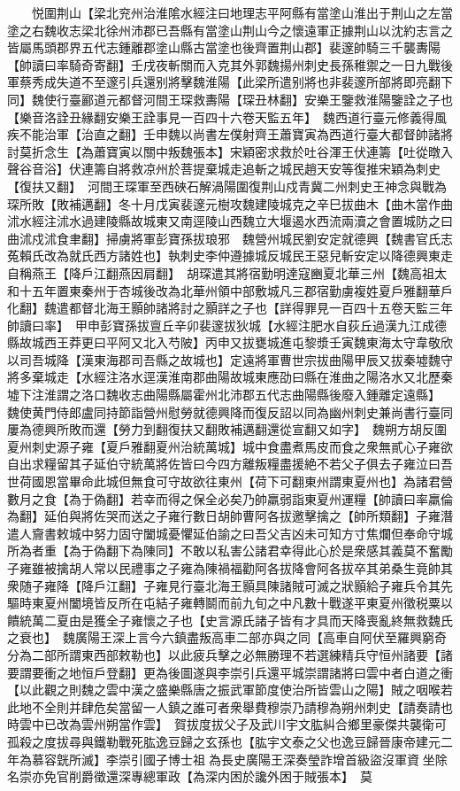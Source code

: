 　　悦圍荆山【梁北兖州治淮隂水經注曰地理志平阿縣有當塗山淮出于荆山之左當塗之右魏收志梁北徐州沛郡已吾縣有當塗山荆山今之懷遠軍正據荆山以沈約志言之皆屬馬頭郡界五代志鍾離郡塗山縣古當塗也後齊置荆山郡】裴邃帥騎三千襲夀陽【帥讀曰率騎奇寄翻】壬戌夜斬關而入克其外郭魏揚州刺史長孫稚禦之一日九戰後軍蔡秀成失道不至邃引兵還别將擊魏淮陽【此梁所遣别將也非裴邃所部將即亮翻下同】魏使行臺酈道元都督河間王琛救夀陽【琛丑林翻】安樂王鑒救淮陽鑒詮之子也【樂音洛詮丑緣翻安樂王詮事見一百四十六卷天監五年】　魏西道行臺元修義得風疾不能治軍【治直之翻】壬申魏以尚書左僕射齊王蕭寶寅為西道行臺大都督帥諸將討莫折念生【為蕭寶寅以關中叛魏張本】宋穎密求救於吐谷渾王伏連籌【吐從暾入聲谷音浴】伏連籌自將救凉州於菩提棄城走追斬之城民趙天安等復推宋穎為刺史【復扶又翻】　河間王琛軍至西硤石解渦陽圍復荆山戍青冀二州刺史王神念與戰為琛所敗【敗補邁翻】冬十月戊寅裴邃元樹攻魏建陵城克之辛巳拔曲木【曲木當作曲沭水經注沭水過建陵縣故城東又南逕陵山西魏立大堰遏水西流兩瀆之會置城防之曰曲沭戍沭食聿翻】掃虜將軍彭寶孫拔琅邪　魏營州城民劉安定就德興【魏書官氏志菟賴氏改為就氏西方諸姓也】執刺史李仲遵據城反城民王惡兒斬安定以降德興東走自稱燕王【降戶江翻燕因肩翻】　胡琛遣其將宿勤明達寇豳夏北華三州【魏高祖太和十五年置東秦州于杏城後改為北華州領中部敷城凡三郡宿勤虜複姓夏戶雅翻華戶化翻】魏遣都督北海王顥帥諸將討之顥詳之子也【詳得罪見一百四十五卷天監三年帥讀曰率】　甲申彭寶孫拔亶丘辛卯裴邃拔狄城【水經注肥水自荻丘過漢九江成德縣故城西王莽更曰平阿又北入芍陂】丙申又拔甕城進屯黎漿壬寅魏東海太守韋敬欣以司吾城降【漢東海郡司吾縣之故城也】定遠將軍曹世宗拔曲陽甲辰又拔秦墟魏守將多棄城走【水經注洛水逕漢淮南郡曲陽故城東應劭曰縣在淮曲之陽洛水又北歷秦墟下注淮謂之洛口魏收志曲陽縣屬霍州北沛郡五代志曲陽縣後廢入鍾離定遠縣】　魏使黄門侍郎盧同持節詣營州慰勞就德興降而復反詔以同為幽州刺史兼尚書行臺同屢為德興所敗而還【勞力到翻復扶又翻敗補邁翻還從宣翻又如字】　魏朔方胡反圍夏州刺史源子雍【夏戶雅翻夏州治統萬城】城中食盡煮馬皮而食之衆無貳心子雍欲自出求糧留其子延伯守統萬將佐皆曰今四方離叛糧盡援絶不若父子俱去子雍泣曰吾世荷國恩當畢命此城但無食可守故欲往東州【荷下可翻東州謂東夏州也】為諸君營數月之食【為于偽翻】若幸而得之保全必矣乃帥羸弱詣東夏州運糧【帥讀曰率羸倫為翻】延伯與將佐哭而送之子雍行數日胡帥曹阿各拔邀擊擒之【帥所類翻】子雍潛遣人齎書敕城中努力固守闔城憂懼延伯諭之曰吾父吉凶未可知方寸焦爛但奉命守城所為者重【為于偽翻下為陳同】不敢以私害公諸君幸得此心於是衆感其義莫不奮勵子雍雖被擒胡人常以民禮事之子雍為陳禍福勸阿各拔降會阿各拔卒其弟桑生竟帥其衆随子雍降【降戶江翻】子雍見行臺北海王顥具陳諸賊可滅之狀顥給子雍兵令其先驅時東夏州闔境皆反所在屯結子雍轉鬬而前九旬之中凡數十戰遂平東夏州徵税粟以饋統萬二夏由是獲全子雍懷之子也【史言源氏諸子皆有才具而天降喪亂終無救魏氏之衰也】　魏廣陽王深上言今六鎮盡叛高車二部亦與之同【高車自阿伏至羅興窮奇分為二部所謂東西部敕勒也】以此疲兵擊之必無勝理不若選練精兵守恒州諸要【諸要謂要衝之地恒戶登翻】更為後圖遂與李崇引兵還平城崇謂諸將曰雲中者白道之衝【以此觀之則魏之雲中漢之盛樂縣唐之振武軍節度使治所皆雲山之陽】賊之咽喉若此地不全則并肆危矣當留一人鎮之誰可者衆舉費穆崇乃請穆為朔州刺史【請奏請也時雲中已改為雲州朔當作雲】　賀拔度拔父子及武川宇文肱糾合鄉里豪傑共襲衛可孤殺之度拔尋與鐵勒戰死肱逸豆歸之玄孫也【肱宇文泰之父也逸豆歸晉康帝建元二年為慕容皝所滅】李崇引國子博士祖為長史廣陽王深奏瑩詐增首級盜沒軍資坐除名崇亦免官削爵徵還深專總軍政【為深内困於讒外困于賊張本】　莫